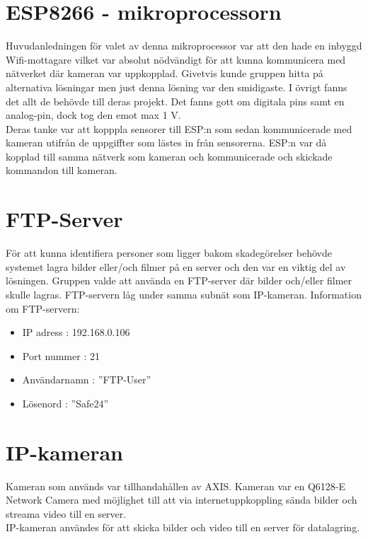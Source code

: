 \section{ESP8266 - mikroprocessorn}
Huvudanledningen för valet av denna mikroprocessor var att den hade en inbyggd Wifi-mottagare vilket var absolut nödvändigt för att kunna kommunicera med nätverket där kameran var uppkopplad. Givetvis kunde gruppen hitta på alternativa lösningar men just denna lösning var den smidigaste. I övrigt fanns det allt de behövde till deras projekt. Det fanns gott om digitala pins samt en analog-pin, dock tog den emot max 1 V. \\

Deras tanke var att kopppla sensorer till ESP:n som sedan kommunicerade med kameran utifrån de uppgiffter som lästes in från sensorerna. ESP:n var då kopplad till samma nätverk som kameran och kommunicerade och skickade kommandon till kameran.\\
\section{FTP-Server}
För att kunna identifiera personer som ligger bakom skadegörelser behövde systemet lagra bilder eller/och filmer på en server och den var en viktig del av lösningen. Gruppen valde att använda en FTP-server där bilder och/eller filmer skulle lagras. FTP-servern låg under samma subnät som IP-kameran. Information om FTP-servern:

\begin{itemize}
\item IP adress : 192.168.0.106

\item Port nummer : 21

\item Användarnamn : ”FTP-User”

\item Lösenord : ”Safe24”

\end{itemize}
\section{IP-kameran}
Kameran som används var tillhandahållen av AXIS. Kameran var en Q6128-E Network Camera med möjlighet till att via  internetuppkoppling sända bilder och streama video till en server.\\

IP-kameran användes för att skicka bilder och video till en server för datalagring.\\

